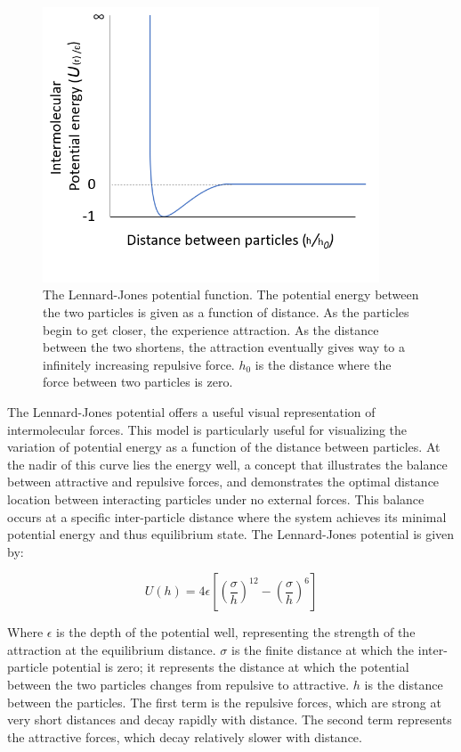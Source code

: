 \begin{figure}[h!!]     %
        \begin{center}
          \includegraphics[width=100mm]{chapter1/Lennard's potato.PNG}
\end{center}
\caption{The Lennard-Jones potential function. The potential energy between the two particles is given as a function of distance. As the particles begin to get closer, the experience attraction. As the distance between the two shortens, the attraction eventually gives way to a infinitely increasing repulsive force. $h_0$ is the distance where the force between two particles is zero.}
\label{fig:potato}                 %
\end{figure}

The Lennard-Jones potential offers a useful visual representation of intermolecular forces. This model is particularly useful for visualizing the variation of potential energy as a function of the distance between particles. At the nadir of this curve lies the energy well, a concept that illustrates the balance between attractive and repulsive forces, and demonstrates the optimal distance location between interacting particles under no external forces. This balance occurs at a specific inter-particle distance where the system achieves its minimal potential energy and thus equilibrium state. The Lennard-Jones potential is given by:

\begin{equation}
U(h) = 4 \epsilon \left[ \left( \frac{\sigma}{h} \right)^{12} - \left( \frac{\sigma}{h} \right)^6 \right]
\end{equation}

Where $\epsilon$ is the depth of the potential well, representing the strength of the attraction at the equilibrium distance. $\sigma$ is the finite distance at which the inter-particle potential is zero; it represents the distance at which the potential between the two particles changes from repulsive to attractive. $h$ is the distance between the particles. The first term is the repulsive forces, which are strong at very short distances and decay rapidly with distance. The second term represents the attractive forces, which decay relatively slower with distance.

